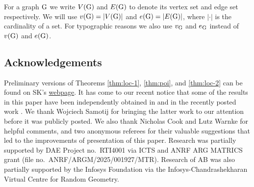 \documentclass[a4paper,11pt,english,reqno]{amsart}
\numberwithin{equation}{section}
\renewcommand{\geq}{\geqslant}
\newcommand{\E}{\mathbb{E}}
\newcommand{\UTH}{\textup{UT}_{\textup{H}}(\delta)}
\newcommand{\uH}{\textup{H}}
\newcommand{\G}{\mathbb{G}}
\newcommand{\tu}[1]{\textup{#1}}
\newcommand{\set}[1]{[\![#1]\!]}
\newtheorem*{definition_un}{Definition}
\begin{document}
	
	For a graph $\tu{G}$ we write $V(\tu{G})$ and $E(\tu{G})$ to denote its vertex set and edge set respectively. We will use $v(\tu{G}) = |V(\tu{G})|$ and $e(\tu{G}) = |E(\tu{G})|$, where $|\cdot|$ is the cardinality of a set. For typographic reasons we also use $v_{\tu{G}}$ and $e_{\tu{G}}$ instead of $v(\tu{G})$ and $e(\tu{G})$. 
	
	
	
	
	
	
	
	
	
	
	
	\subsection*{Acknowledgements} Preliminary versions of Theorems \ref{thm:loc-1}, \ref{thm:poi}, and \ref{thm:loc-2} can be found on SK's
	\href{https://sites.google.com/icts.res.in/shaibalkarmakar/home}{webpage}. It has come to our recent notice that some of the results in this paper have been independently obtained in \cite{AS25} and in the recently posted work \cite{CAHMS}. We thank Wojciech Samotij for bringing the latter work to our attention before it was publicly posted. We also thank Nicholas Cook and Lutz Warnke for helpful comments{, and {two} anonymous referees for their valuable suggestions {that led to the improvements of presentation of this paper}.} Research was partially supported by DAE Project no.~RTI4001 via ICTS and ANRF ARG MATRICS grant (file no.~ANRF/ARGM/2025/001927/MTR). Research of AB was also partially supported by the Infosys Foundation via the Infosys-Chandrashekharan Virtual Centre for Random Geometry.
	
\end{document}
